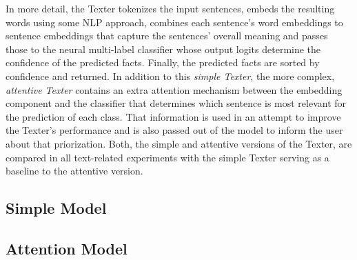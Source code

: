 In more detail, the Texter tokenizes the input sentences, embeds the resulting words using some NLP approach, combines each sentence's word embeddings to sentence embeddings that capture the sentences' overall meaning and passes those to the neural multi-label classifier whose output logits determine the confidence of the predicted facts. Finally, the predicted facts are sorted by confidence and returned. In addition to this \emph{simple Texter}, the more complex, \emph{attentive Texter} contains an extra attention mechanism between the embedding component and the classifier that determines which sentence is most relevant for the prediction of each class. That information is used in an attempt to improve the Texter's performance and is also passed out of the model to inform the user about that priorization. Both, the simple and attentive versions of the Texter, are compared in all text-related experiments with the simple Texter serving as a baseline to the attentive version.

\subsection{Simple Model}
\label{subsec:4_approach/1_texter/1_simple_model}


\subsection{Attention Model}
\label{subsec:4_approach/1_texter/2_attention_model}


